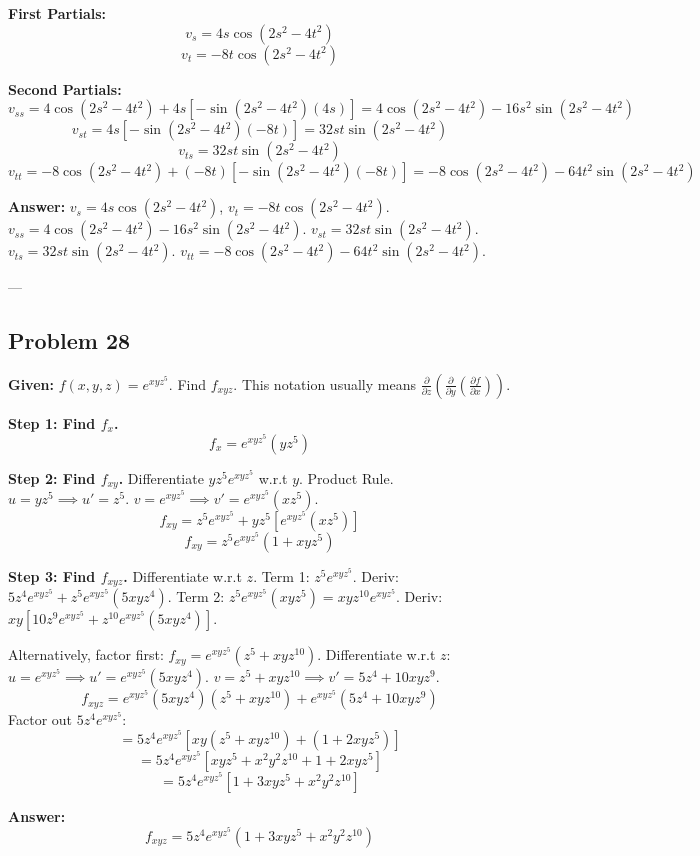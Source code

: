 \documentclass{article}
\begin{document}
\textbf{First Partials:}
\[ v_s = 4s \cos(2s^2 - 4t^2) \]
\[ v_t = -8t \cos(2s^2 - 4t^2) \]

\textbf{Second Partials:}
\[ v_{ss} = 4 \cos(2s^2 - 4t^2) + 4s [-\sin(2s^2 - 4t^2)(4s)] = 4 \cos(2s^2 - 4t^2) - 16s^2 \sin(2s^2 - 4t^2) \]
\[ v_{st} = 4s [-\sin(2s^2 - 4t^2)(-8t)] = 32st \sin(2s^2 - 4t^2) \]
\[ v_{ts} = 32st \sin(2s^2 - 4t^2) \]
\[ v_{tt} = -8 \cos(2s^2 - 4t^2) + (-8t) [-\sin(2s^2 - 4t^2)(-8t)] = -8 \cos(2s^2 - 4t^2) - 64t^2 \sin(2s^2 - 4t^2) \]

\textbf{Answer:}
$v_s = 4s \cos(2s^2 - 4t^2)$, $v_t = -8t \cos(2s^2 - 4t^2)$.
$v_{ss} = 4 \cos(2s^2 - 4t^2) - 16s^2 \sin(2s^2 - 4t^2)$.
$v_{st} = 32st \sin(2s^2 - 4t^2)$.
$v_{ts} = 32st \sin(2s^2 - 4t^2)$.
$v_{tt} = -8 \cos(2s^2 - 4t^2) - 64t^2 \sin(2s^2 - 4t^2)$.

---

\subsection*{Problem 28}
\textbf{Given:} $f(x, y, z) = e^{xyz^5}$. Find $f_{xyz}$.
This notation usually means $\frac{\partial}{\partial z} \left( \frac{\partial}{\partial y} \left( \frac{\partial f}{\partial x} \right) \right)$.

\textbf{Step 1: Find $f_x$.}
\[ f_x = e^{xyz^5} (yz^5) \]

\textbf{Step 2: Find $f_{xy}$.}
Differentiate $yz^5 e^{xyz^5}$ w.r.t $y$. Product Rule.
$u = yz^5 \implies u' = z^5$.
$v = e^{xyz^5} \implies v' = e^{xyz^5}(xz^5)$.
\[ f_{xy} = z^5 e^{xyz^5} + yz^5 [e^{xyz^5}(xz^5)] \]
\[ f_{xy} = z^5 e^{xyz^5} (1 + xyz^5) \]

\textbf{Step 3: Find $f_{xyz}$.}
Differentiate w.r.t $z$.
Term 1: $z^5 e^{xyz^5}$.
Deriv: $5z^4 e^{xyz^5} + z^5 e^{xyz^5}(5xyz^4)$.
Term 2: $z^5 e^{xyz^5} (xyz^5) = xy z^{10} e^{xyz^5}$.
Deriv: $xy [ 10z^9 e^{xyz^5} + z^{10} e^{xyz^5}(5xyz^4) ]$.

Alternatively, factor first: $f_{xy} = e^{xyz^5}(z^5 + xyz^{10})$.
Differentiate w.r.t $z$:
$u = e^{xyz^5} \implies u' = e^{xyz^5}(5xyz^4)$.
$v = z^5 + xyz^{10} \implies v' = 5z^4 + 10xyz^9$.
\[ f_{xyz} = e^{xyz^5}(5xyz^4)(z^5 + xyz^{10}) + e^{xyz^5}(5z^4 + 10xyz^9) \]
Factor out $5z^4 e^{xyz^5}$:
\[ = 5z^4 e^{xyz^5} [ xy(z^5 + xyz^{10}) + (1 + 2xyz^5) ] \]
\[ = 5z^4 e^{xyz^5} [ xyz^5 + x^2y^2z^{10} + 1 + 2xyz^5 ] \]
\[ = 5z^4 e^{xyz^5} [ 1 + 3xyz^5 + x^2y^2z^{10} ] \]

\textbf{Answer:}
\[ f_{xyz} = 5z^4 e^{xyz^5} (1 + 3xyz^5 + x^2y^2z^{10}) \]
\end{document}
